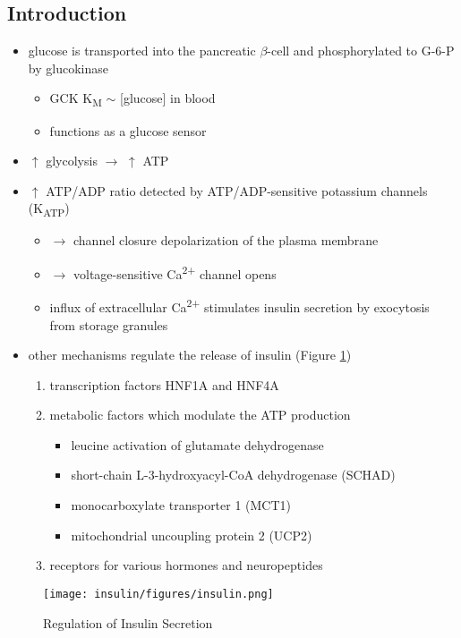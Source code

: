 \documentclass{scrartcl}
\begin{document}
\subsection{Introduction}
\label{sec:org765e19f}
\begin{itemize}
\item glucose is transported into the pancreatic \(\beta\)-cell and phosphorylated to G-6-P by glucokinase
\begin{itemize}
\item GCK K\textsubscript{M} \(\sim\) [glucose] in blood
\item functions as a glucose sensor
\end{itemize}
\item \(\uparrow\) glycolysis \(\to\) \(\uparrow\) ATP
\item \(\uparrow\) ATP/ADP ratio detected by ATP/ADP-sensitive potassium channels (K\textsubscript{ATP})
\begin{itemize}
\item \(\to\) channel closure depolarization of the plasma membrane
\item \(\to\) voltage-sensitive Ca\textsuperscript{2+} channel opens
\item influx of extracellular Ca\textsuperscript{2+} stimulates insulin secretion by
exocytosis from storage granules
\end{itemize}

\item other mechanisms regulate the release of insulin (Figure \ref{fig:orgad49bdd})
\begin{enumerate}
\item transcription factors HNF1A and HNF4A
\item metabolic factors which modulate the ATP production
\begin{itemize}
\item leucine activation of glutamate dehydrogenase
\item short-chain L-3-hydroxyacyl-CoA dehydrogenase (SCHAD)
\item monocarboxylate transporter 1 (MCT1)
\item mitochondrial uncoupling protein 2 (UCP2)
\end{itemize}
\item receptors for various hormones and neuropeptides
\end{enumerate}
\end{itemize}



\begin{figure}[htbp]
\centering
\texttt{[image: insulin/figures/insulin.png]}
\caption[insulin]{\label{fig:orgad49bdd}Regulation of Insulin Secretion}
\end{figure}
\end{document}
